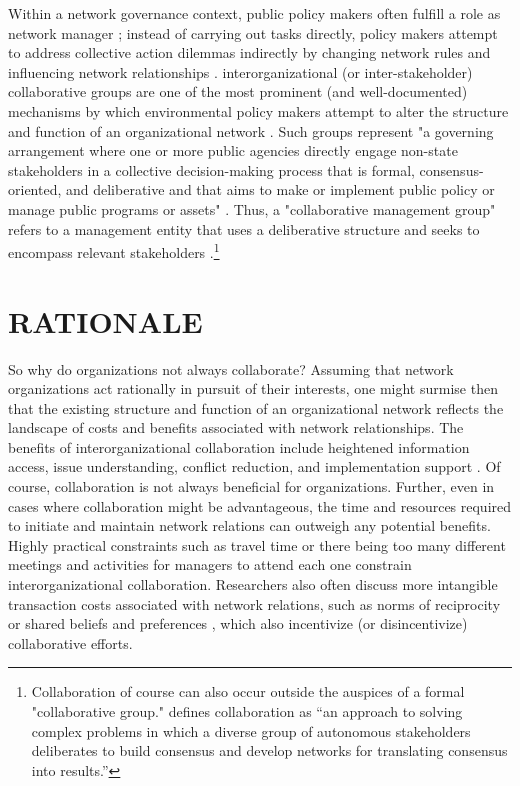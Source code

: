\documentclass[12pt,a4paper,titlepage]{article}
\begin{document}
Within a network governance context, public policy makers often fulfill a role as network manager \parencite{klijn2000}; instead of carrying out tasks directly, policy makers attempt to address collective action dilemmas indirectly by changing network rules and influencing network relationships \parencite{klijn2006}. interorganizational (or inter-stakeholder) collaborative groups are one of the most prominent (and well-documented) mechanisms by which environmental policy makers attempt to alter the structure and function of an organizational network \parencite[see][for recent discussions]{ansell2008,emerson2012,margerum2011}. Such groups represent "a governing arrangement where one or more public agencies directly engage non-state stakeholders in a collective decision-making process that is formal, consensus-oriented, and deliberative and that aims to make or implement public policy or manage public programs or assets" \parencite[544]{ansell2008} \parencite[see also][]{emerson2012,imperial2005,margerum2011}. Thus, a "collaborative management group" refers to a management entity that uses a deliberative structure and seeks to encompass relevant stakeholders \parencite{ansell2008}.\footnote{Collaboration of course can also occur outside the auspices of a formal "collaborative group." \textcite[6]{margerum2011} defines collaboration as “an approach to solving complex problems in which a diverse group of autonomous stakeholders deliberates to build consensus and develop networks for translating consensus into results.”}

\section{\bf\MakeUppercase{Rationale}}

So why do organizations not always collaborate? Assuming that network organizations act rationally in pursuit of their interests, one might surmise then that the existing structure and function of an organizational network reflects the landscape of costs and benefits associated with network relationships. The benefits of interorganizational collaboration include heightened information access, issue understanding, conflict reduction, and implementation support \parencite{moreland1993,gigone1993,cragan1990,hill2003,susskind1999,sabatier2005}. Of course, collaboration is not always beneficial for organizations. Further, even in cases where collaboration might be advantageous, the time and resources required to initiate and maintain network relations can outweigh any potential benefits. Highly practical constraints such as travel time \parencite{thomas2003} or there being too many different meetings and activities for managers to attend each one \parencite{margerum2011} constrain interorganizational collaboration. Researchers also often discuss more intangible transaction costs associated with network relations, such as norms of reciprocity \parencite{putnam2000} or shared beliefs and preferences \parencite{schneider2003, sabatier1993}, which also incentivize (or disincentivize) collaborative efforts.
\end{document}

